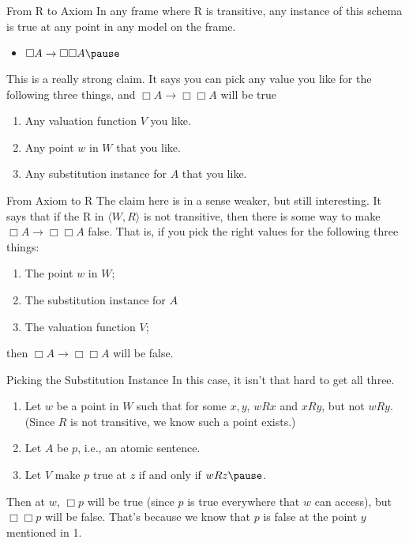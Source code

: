 \documentclass[
  ignorenonframetext,
]{beamer}
\providecommand{\tightlist}{%
  \setlength{\itemsep}{0pt}\setlength{\parskip}{0pt}}
\renewcommand{\,}{\text{, }}
\begin{document}
\begin{frame}{From R to Axiom}
\protect\hypertarget{from-r-to-axiom}{}
In any frame where R is transitive, any instance of this schema is true
at any point in any model on the frame.

\begin{itemize}
\tightlist
\item
  \(\Box A \rightarrow \Box \Box A \pause\)
\end{itemize}

This is a really strong claim. It says you can pick any value you like
for the following three things, and \(\Box A \rightarrow \Box \Box A\)
will be true

\begin{enumerate}
\tightlist
\item
  Any valuation function \(V\) you like.
\item
  Any point \(w\) in \(W\) that you like.
\item
  Any substitution instance for \(A\) that you like.
\end{enumerate}
\end{frame}

\begin{frame}{From Axiom to R}
\protect\hypertarget{from-axiom-to-r}{}
The claim here is in a sense weaker, but still interesting. It says that
if the R in \(\langle W, R \rangle\) is not transitive, then there is
some way to make \(\Box A \rightarrow \Box \Box A\) false. \pause  That
is, if you pick the right values for the following three things:

\begin{enumerate}
\tightlist
\item
  The point \(w\) in \(W\);
\item
  The substitution instance for \(A\)
\item
  The valuation function \(V\);
\end{enumerate}

then \(\Box A \rightarrow \Box \Box A\) will be false.
\end{frame}

\begin{frame}{Picking the Substitution Instance}
\protect\hypertarget{picking-the-substitution-instance}{}
In this case, it isn't that hard to get all three.

\begin{enumerate}
\tightlist
\item
  Let \(w\) be a point in \(W\) such that for some \(x, y\), \(wRx\) and
  \(xRy\), but not \(wRy\). (Since \(R\) is not transitive, we know such
  a point exists.)
\item
  Let \(A\) be \(p\), i.e., an atomic sentence.
\item
  Let \(V\) make \(p\) true at \(z\) if and only if \(wRz \pause\).
\end{enumerate}

Then at \(w\), \(\Box p\) will be true (since \(p\) is true everywhere
that \(w\) can access), but \(\Box \Box p\) will be false. That's
because we know that \(p\) is false at the point \(y\) mentioned in 1.
\end{frame}
\end{document}
